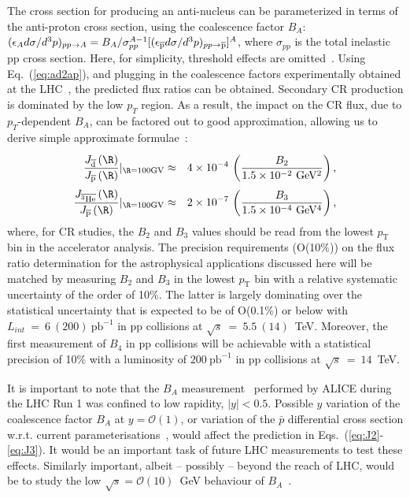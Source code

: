 The cross section for producing an anti-nucleus can be parameterized in terms of the anti-proton cross section, using the coalescence factor $B_A$: 
$(\epsilon_A d\sigma/d^3p)_{pp\to A} = B_A/\sigma_{pp}^{A-1} [(\epsilon_{\overline{\rm p}} d\sigma/d^3p)_{pp\to \overline{\rm p}}]^A$, 
where $\sigma_{pp}$ is the total inelastic pp cross section. 
Here, for simplicity, threshold effects are omitted~\cite{Duperray:2002pj,Duperray:2003tv,Blum:2017qnn}. 
%
Using Eq.~(\ref{eq:ad2ap}), and plugging in the coalescence factors experimentally obtained at the LHC~\cite{Acharya:2017fvb}, the predicted flux ratios can be obtained. 
Secondary CR production is dominated by the low $p_T$ region. As a result, the impact on the CR flux, due to $p_T$-dependent $B_A$, can be factored out to good approximation, allowing us to derive simple approximate formulae~\cite{Blum:2017qnn}:
%
\begin{eqnarray}\label{eq:J2}\frac{J_{\overline{\rm d}}\left(\R\right)}{J_{\overline{\rm p}}\left(\R\right)}\huge|_{\R=100{\rm GV}}&\approx&4\times10^{-4}\,\left(\frac{B_2}{1.5\times10^{-2}~\rm GeV^2}\right),\\%
%
%
\label{eq:J3}\frac{J_{\overline{^3\rm He}}\left(\R\right)}{J_{\overline{\rm p}}\left(\R\right)}\huge|_{\R=100{\rm GV}}&\approx&2\times10^{-7}\,\left(\frac{B_3}{1.5\times10^{-4}~\rm GeV^4}\right),\end{eqnarray}
%
where, for CR studies, the $B_2$ and $B_3$ values should be read from the lowest $p_{\mathrm{T}}$ bin in the accelerator analysis. 
%
The precision requirements (O(10$\%$)) on the flux ratio determination for the astrophysical applications discussed here will be matched by measuring $B_{2}$ and $B_{3}$ in the lowest $p_{\mathrm{T}}$ bin with a relative systematic uncertainty of the order of 10$\%$. The latter is largely dominating over the statistical uncertainty that is expected to be of O(0.1$\%$) or below with $L_{int}~=~6~(200)~\mathrm{pb}^{-1}$ in pp collisions at $\sqrt{s}~=~5.5~(14)$~TeV. 
Moreover, the first measurement of $B_{4}$ in pp collisions will be achievable with a statistical precision of 10$\%$ with a luminosity of $200~\mathrm{pb}^{-1}$ in pp collisions at $\sqrt{s}~=~14$~TeV.

It is important to note that the $B_A$ measurement~\cite{Acharya:2017fvb} performed by ALICE during the LHC Run 1 was confined to low rapidity, $|y|<0.5$. Possible $y$ variation of the coalescence factor $B_A$ at $y=\mathcal{O}(1)$, or variation of the $\bar p$ differential cross section w.r.t. current parameterisations~\cite{Donato:2017ywo}, would affect the prediction in Eqs.~(\ref{eq:J2}-\ref{eq:J3}). It would be an important task of future LHC measurements to test these effects. Similarly important, albeit -- possibly -- beyond the reach of LHC, would be to study the low $\sqrt{s}=\mathcal{O}(10)$~GeV behaviour of $B_A$~\cite{Blum:2017qnn}.


